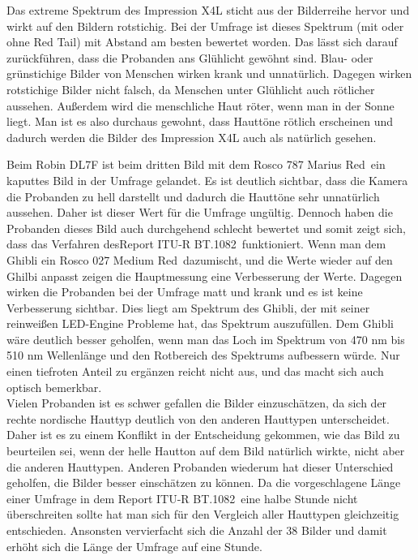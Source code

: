 Das extreme Spektrum des Impression X4L sticht aus der Bilderreihe hervor und wirkt auf den Bildern rotstichig. Bei der Umfrage ist dieses Spektrum (mit oder ohne \glqq Red Tail\grqq) mit Abstand am besten bewertet worden. Das lässt sich darauf zurückführen, dass die Probanden ans Glühlicht gewöhnt sind. Blau- oder grünstichige Bilder von Menschen wirken krank und unnatürlich. Dagegen wirken rotstichige Bilder nicht falsch, da Menschen unter Glühlicht auch rötlicher aussehen. Außerdem wird die menschliche Haut röter, wenn man in der Sonne liegt. Man ist es also durchaus gewohnt, dass Hauttöne rötlich erscheinen und dadurch werden die Bilder des Impression X4L auch als natürlich gesehen. 

Beim Robin DL7F ist beim dritten Bild mit dem Rosco 787 \glqq Marius Red\grqq\ ein kaputtes Bild in der Umfrage gelandet. Es ist deutlich sichtbar, dass die Kamera die Probanden zu hell darstellt und dadurch die Hauttöne sehr unnatürlich aussehen. Daher ist dieser Wert für die Umfrage ungültig. Dennoch haben die Probanden dieses Bild auch durchgehend schlecht bewertet und somit zeigt sich, dass das Verfahren des\glqq Report ITU-R BT.1082\grqq\ funktioniert. 
Wenn man dem Ghibli ein Rosco 027 \glqq Medium Red\grqq\ dazumischt, und die Werte wieder auf den Ghilbi anpasst zeigen die Hauptmessung eine Verbesserung der Werte. Dagegen wirken die Probanden bei der Umfrage matt und krank und es ist keine Verbesserung sichtbar. Dies liegt am Spektrum des Ghibli, der mit seiner reinweißen LED-Engine Probleme hat, das Spektrum auszufüllen. Dem Ghibli wäre deutlich besser geholfen, wenn man das Loch im Spektrum von 470 nm bis 510 nm Wellenlänge und den Rotbereich des Spektrums aufbessern würde. Nur einen tiefroten Anteil zu ergänzen reicht nicht aus, und das macht sich auch optisch bemerkbar.\\
Vielen Probanden ist es schwer gefallen die Bilder einzuschätzen, da sich der rechte nordische Hauttyp deutlich von den anderen Hauttypen unterscheidet. Daher ist es zu einem Konflikt in der Entscheidung gekommen, wie das Bild zu beurteilen sei, wenn der helle Hautton auf dem Bild natürlich wirkte, nicht aber die anderen Hauttypen. Anderen Probanden wiederum hat dieser Unterschied geholfen, die Bilder besser einschätzen zu können. Da die vorgeschlagene Länge einer Umfrage in dem \glqq Report ITU-R BT.1082\grqq\ eine halbe Stunde nicht überschreiten sollte hat man sich für den Vergleich aller Hauttypen gleichzeitig entschieden. Ansonsten vervierfacht sich die Anzahl der 38 Bilder und damit erhöht sich die Länge der Umfrage auf eine Stunde. 




